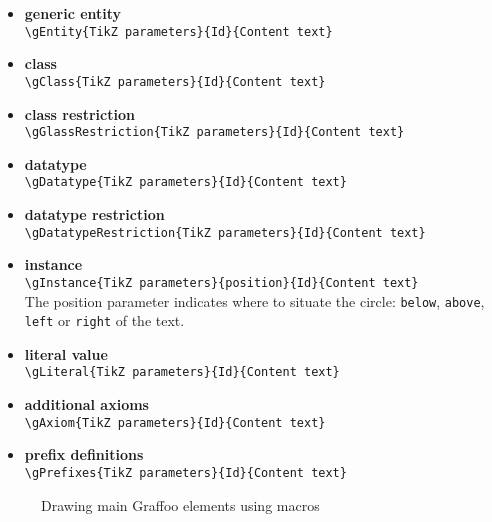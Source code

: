 \begin{itemize}
	\item \textbf{generic entity}\\ \verb|\gEntity{TikZ parameters}{Id}{Content text}|
	
	\item \textbf{class}\\ \verb|\gClass{TikZ parameters}{Id}{Content text}|	
	
	\item \textbf{class restriction}\\ \verb|\gGlassRestriction{TikZ parameters}{Id}{Content text}|
	
	\item \textbf{datatype}\\ \verb|\gDatatype{TikZ parameters}{Id}{Content text}|
	\item \textbf{datatype restriction}\\ \verb|\gDatatypeRestriction{TikZ parameters}{Id}{Content text}|
	
	\item \textbf{instance}\\ \verb|\gInstance{TikZ parameters}{position}{Id}{Content text}| \\ The position parameter indicates where to situate the circle: \texttt{below}, \texttt{above}, \texttt{left} or \texttt{right} of the text.

	\item \textbf{literal value}\\ \verb|\gLiteral{TikZ parameters}{Id}{Content text}|

	\item \textbf{additional axioms}\\ \verb|\gAxiom{TikZ parameters}{Id}{Content text}|
	
	\item \textbf{prefix definitions}\\ \verb|\gPrefixes{TikZ parameters}{Id}{Content text}|
\end{itemize}

\begin{figure}[!ht]
	\centering
	\caption{Drawing main Graffoo elements using macros}
	\label{fig:macros-elements}
\end{figure}


